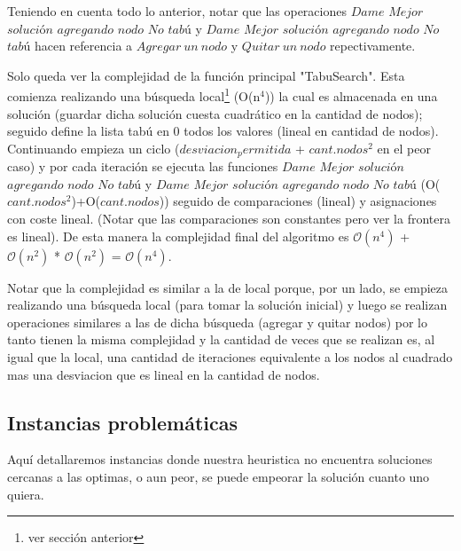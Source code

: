  Teniendo en cuenta todo lo anterior, notar que las operaciones $Dame$ $Mejor$ $solución$ $agregando$ $nodo$ $No$ $tabú$ y $Dame$ $Mejor$ $solución$ $agregando$ $nodo$ $No$ $tabú$ hacen referencia a $Agregar\ un\ nodo$ y $Quitar\ un\ nodo$ repectivamente.\newline

 Solo queda ver la complejidad de la función principal "TabuSearch". Esta comienza realizando una búsqueda local\footnote{ver sección anterior} (O(n$^{4}$)) la cual es almacenada en una solución (guardar dicha solución cuesta cuadrático en la cantidad de nodos); seguido define la lista tabú en 0 todos los valores (lineal en cantidad de nodos). Continuando empieza un ciclo ($desviacion_permitida$ + $cant.nodos$$^{2}$ en el peor caso) y por cada iteración se ejecuta las funciones $Dame$ $Mejor$ $solución$ $agregando$ $nodo$ $No$ $tabú$ y $Dame$ $Mejor$ $solución$ $agregando$ $nodo$ $No$ $tabú$ (O($cant.nodos$$^{2}$)+O($cant.nodos$)) seguido de comparaciones (lineal) y asignaciones con coste lineal. (Notar que las comparaciones son constantes pero ver la frontera es lineal). \newline
 De esta manera la complejidad final del algoritmo es $\mathcal{O}(n^{4})$ + $\mathcal{O}(n^{2})$ * $\mathcal{O}(n^{2})$ = $\mathcal{O}(n^{4})$.  \newline

Notar que la complejidad es similar a la de local porque, por un lado, se empieza realizando una búsqueda local (para tomar la solución inicial) y luego se realizan operaciones similares a las de dicha búsqueda (agregar y quitar nodos) por lo tanto tienen la misma complejidad y la cantidad de veces que se realizan es, al igual que la local,  una cantidad de iteraciones equivalente a los nodos al cuadrado mas una desviacion que es lineal en la cantidad de nodos.


\subsection{Instancias problemáticas}

 Aquí detallaremos instancias donde nuestra heuristica no encuentra soluciones cercanas a las optimas, o aun peor, se puede empeorar la solución cuanto uno quiera.

